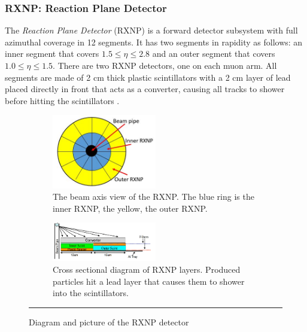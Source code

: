 \subsubsection{RXNP: Reaction Plane Detector}
The \textit{Reaction Plane Detector} (RXNP) is a forward detector subsystem \citep{RXNPfocus} with full azimuthal coverage in 12 segments. It has two segments in rapidity as follows: an inner segment that covers $1.5 \leq \eta \leq 2.8$ and an outer segment that covers $1.0 \leq \eta \leq 1.5$. There are two RXNP detectors, one on each muon arm. All segments are made of 2 cm thick plastic scintillators with a 2 cm layer of lead placed directly in front that acts as a converter, causing all tracks to shower before hitting the scintillators \citep{RXNPfocusER}.  
\begin{figure}
\begin{subfigure}[b]{1\textwidth}
    \centering
    \includegraphics[width=0.5\textwidth]{Figures/RXNPdiagram.JPG}
    \caption{The beam axis view of the RXNP. The blue ring is the inner RXNP, the yellow, the outer RXNP.}

\end{subfigure}
\begin{subfigure}[b]{1\textwidth}
\centering
  \includegraphics[width=0.5\textwidth]{Figures/RXNPschem.jpg}
  \caption{Cross sectional diagram of RXNP layers. Produced particles hit a lead layer that causes them to shower into the scintillators.}
\end{subfigure}

  \rule{35em}{0.5pt}
\caption[Diagram and picture of the RXNP detector]{Diagram and picture of the RXNP detector}
      \label{fig:RXNP}
\end{figure}



